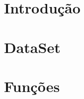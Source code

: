 \documentclass[11pt,openright]{book}
\begin{document}
\chapter{Introdução}


\chapter{DataSet}


\chapter{Funções}



%




\clearemptydoublepage
\begin{footnotesize}
	\renewcommand{\bibname}{Bibliography}
	
	
	
\end{footnotesize}








\appendix




\blankpage
\newpage


\backmatter



\clearemptydoublepage
\end{document}
